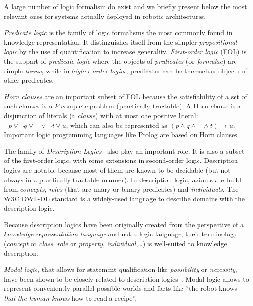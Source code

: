 A large number of logic formalism do exist and we briefly present below the most
relevant ones for systems actually deployed in robotic architectures.

\emph{Predicate logic} is the family of logic formalisms the most commonly
found in knowledge representation. It distinguishes itself from the simpler
\emph{propositional logic} by the use of quantification to increase generality.
\emph{First-order logic} (FOL) is the subpart of \emph{predicate logic} where the
objects of \emph{predicates} (or \emph{formulae}) are simple \emph{terms},
while in \emph{higher-order logics}, predicates can be themselves objects of
other predicates.

\emph{Horn clauses} are an important subset of FOL because the satisfiability
of a set of such clauses is a $P$-complete problem (\ie practically tractable).
A Horn clause is a disjunction of literals (a \emph{clause}) with at most one
positive literal: $\neg p \lor \neg q \lor \cdots \lor \neg t \lor u$, which
can also be represented as $(p \land q \land \cdots \land t) \rightarrow u$.
Important logic programming languages like Prolog are based on Horn clauses.

The family of \emph{Description Logics}~\cite{Baader2008} also play an
important role. It is also a subset of the first-order logic, with some
extensions in second-order logic. Description logics are notable because most
of them are known to be decidable (but not always in a practically tractable
manner). In description logic, axioms are build from \emph{concepts},
\emph{roles} (that are unary or binary predicates) and \emph{individuals}. The
W3C OWL-DL standard is a widely-used language to describe domains with the
description logic.

Because description logics have been originally created from the perspective of
a \emph{knowledge representation language} and not a logic language, their
terminology (\emph{concept} or \emph{class}, \emph{role} or \emph{property},
\emph{individual},\ldots) is well-suited to knowledge description.

\emph{Modal logic}, that allows for statement qualification like
\emph{possibility} or \emph{necessity}, have been shown to be closely related
to description logics~\cite{Baader2001}. Modal logic allows to represent conveniently parallel
possible worlds and facts like ``the robot knows \emph{that the human knows}
how to read a recipe''.


